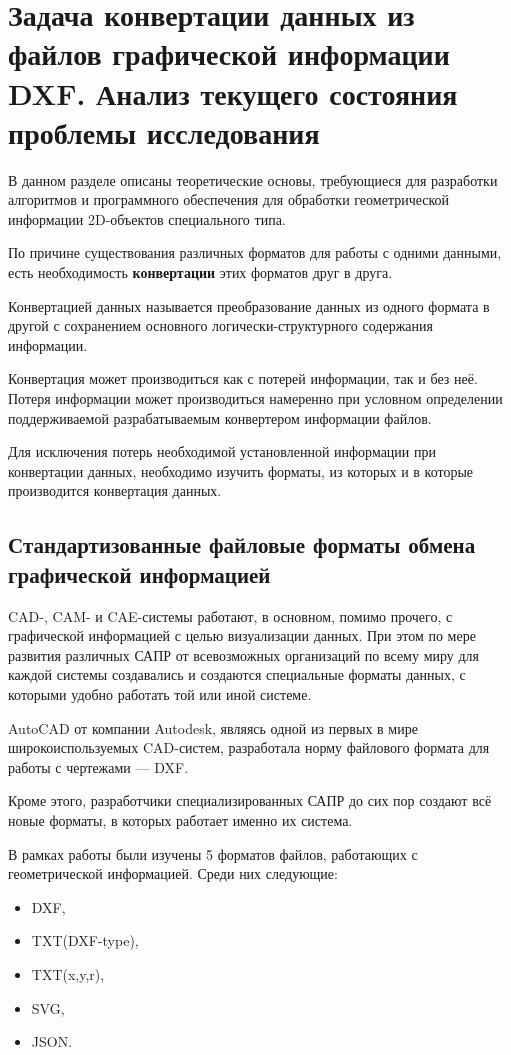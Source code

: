 \chapter{Задача конвертации данных из файлов графической информации DXF. Анализ текущего состояния проблемы исследования}
\label{cha:aktuell}

В данном разделе описаны теоретические основы, требующиеся для разработки алгоритмов и программного обеспечения для обработки геометрической информации 2D-объектов специального типа.

По причине существования различных форматов для работы с одними данными, есть необходимость \textbf{конвертации} этих форматов друг в друга.

Конвертацией данных называется преобразование данных из одного формата в другой с сохранением основного логически-структурного содержания информации.

Конвертация может производиться как с потерей информации, так и без неё. Потеря информации может производиться намеренно при условном определении поддерживаемой разрабатываемым конвертером информации файлов.

Для исключения потерь необходимой установленной информации при конвертации данных, необходимо изучить форматы, из которых и в которые производится конвертация данных.

\section{Стандартизованные файловые форматы обмена графической информацией}

CAD-, CAM- и CAE-системы работают, в основном, помимо прочего, с графической информацией с целью визуализации данных. При этом по мере развития различных САПР от всевозможных организаций по всему миру для каждой системы создавались и создаются специальные форматы данных, с которыми удобно работать той или иной системе.

AutoCAD от компании Autodesk, являясь одной из первых в мире широкоиспользуемых CAD-систем, разработала норму файлового формата для работы с чертежами --- DXF.

Кроме этого, разработчики специализированных САПР до сих пор создают всё новые форматы, в которых работает именно их система. 



В рамках работы были изучены 5 форматов файлов, работающих с геометрической информацией. Среди них следующие:
\begin{itemize}
	\item DXF,
	\item TXT(DXF-type),
	\item TXT(x,y,r),
	\item SVG,
	\item JSON.
\end{itemize}

